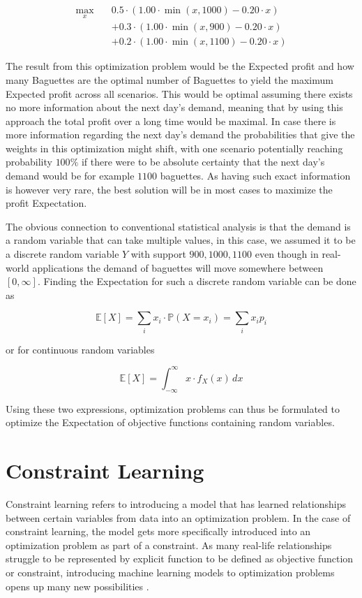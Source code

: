\begin{align*}
	\max_{x} \quad & 0.5 \cdot \left(1.00 \cdot \min(x,1000) - 0.20 \cdot x \right) \\
	&+ 0.3 \cdot \left(1.00 \cdot \min(x,900) - 0.20 \cdot x\right) \\
	&+ 0.2 \cdot \left(1.00 \cdot \min(x,1100) - 0.20 \cdot x\right)
\end{align*}

The result from this optimization problem would be the Expected profit and how many Baguettes are the optimal number of Baguettes to yield the maximum Expected profit across all scenarios. This would be optimal assuming there exists no more information about the next day's demand, meaning that by using this approach the total profit over a long time would be maximal. In case there is more information regarding the next day's demand the probabilities that give the weights in this optimization might shift, with one scenario potentially reaching probability $100\%$ if there were to be absolute certainty that the next day's demand would be for example $1100$ baguettes. As having such exact information is however very rare, the best solution will be in most cases to maximize the profit Expectation. 

The obvious connection to conventional statistical analysis is that the demand is a random variable that can take multiple values, in this case, we assumed it to be a discrete random variable $Y$ with support ${900,1000,1100}$ even though in real-world applications the demand of baguettes will move somewhere between $[0,\infty]$. Finding the Expectation for such a discrete random variable can be done as 

\[
\mathbb{E}[X] = \sum_{i} x_i \cdot \mathbb{P}(X = x_i) = \sum_{i} x_i p_i
\]

or for continuous random variables  
 
\[
\mathbb{E}[X] = \int_{-\infty}^{\infty} x \cdot f_X(x) \, dx
\]

Using these two expressions, optimization problems can thus be formulated to optimize the Expectation of objective functions containing random variables. \cite{BirgeLouveauxStochasticProgramming}


\section{Constraint Learning} \label{sec:constraint_learning}

Constraint learning refers to introducing a model that has learned relationships between certain variables from data into an optimization problem. In the case of constraint learning, the model gets more specifically introduced into an optimization problem as part of a constraint. As many real-life relationships struggle to be represented by explicit function to be defined as objective function or constraint, introducing machine learning models to optimization problems opens up many new possibilities \cite{FAJEMISIN20241}.

